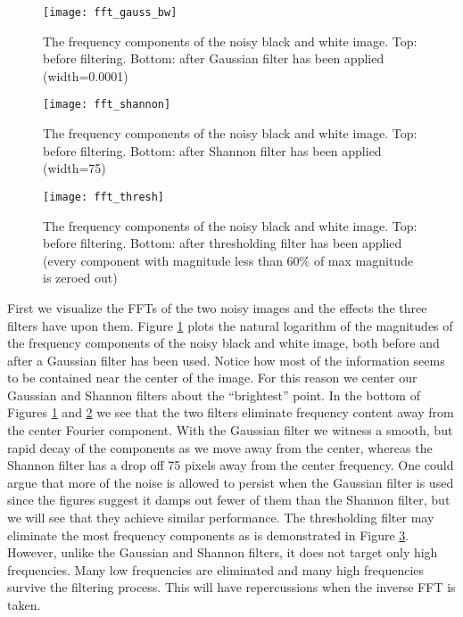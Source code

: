 \documentclass[fleqn,10pt]{../SelfArx} %
\begin{document}
\begin{figure}
\centering
\texttt{[image: fft\_gauss\_bw]}
\caption{The frequency components of the noisy black and white image. Top: before filtering. Bottom: after Gaussian filter has been applied (width=0.0001)}
\label{fig:fft_gauss_bw}
\end{figure}
\begin{figure}
\centering
\texttt{[image: fft\_shannon]}
\caption{The frequency components of the noisy black and white image. Top: before filtering. Bottom: after Shannon filter has been applied (width=75)}
\label{fig:fft_shannon}
\end{figure}
\begin{figure}
\centering
\texttt{[image: fft\_thresh]}
\caption{The frequency components of the noisy black and white image. Top: before filtering. Bottom: after thresholding filter has been applied (every component with magnitude less than 60\% of max magnitude is zeroed out)}
\label{fig:fft_thresh}
\end{figure}


First we visualize the FFTs of the two noisy images and the effects the three filters have upon them. Figure \ref{fig:fft_gauss_bw} plots the natural logarithm of the magnitudes of the frequency components of the noisy black and white image, both before and after a Gaussian filter has been used. Notice how most of the information seems to be contained near the center of the image. For this reason we center our Gaussian and Shannon filters about the ``brightest'' point. In the bottom of Figures \ref{fig:fft_gauss_bw} and \ref{fig:fft_shannon} we see that the two filters eliminate frequency content away from the center Fourier component. With the Gaussian filter we witness a smooth, but rapid decay of the components as we move away from the center, whereas the Shannon filter has a drop off 75 pixels away from the center frequency. One could argue that more of the noise is allowed to persist when the Gaussian filter is used since the figures suggest it damps out fewer of them than the Shannon filter, but we will see that they achieve similar performance. The thresholding filter may eliminate the most frequency components as is demonstrated in Figure \ref{fig:fft_thresh}. However, unlike the Gaussian and Shannon filters, it does not target only high frequencies. Many low frequencies are eliminated and many high frequencies survive the filtering process. This will have repercussions when the inverse FFT is taken.
\end{document}
